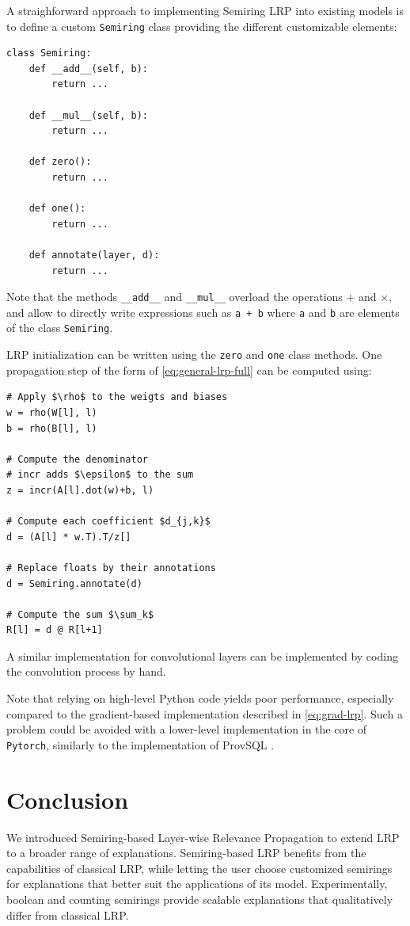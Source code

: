 \documentclass[twocolumn]{../cs-classes/cs-classes}
\newcommand*{\1}{\digitsbb{1}}
\newcommand*{\0}{\digitsbb{0}}
\begin{document}
A straighforward approach to implementing Semiring LRP into existing models is to define a custom \texttt{Semiring} class providing the different customizable elements:
\begin{verbatim}
class Semiring:
    def __add__(self, b):
        return ...

    def __mul__(self, b):
        return ...

    def zero():
        return ...

    def one():
        return ...

    def annotate(layer, d):
        return ...
\end{verbatim}
Note that the methods \texttt{__add__} and \texttt{__mul__} overload the operations $+$ and $\times$, and allow to directly write expressions such as \texttt{a + b} where \texttt{a} and \texttt{b} are elements of the class \texttt{Semiring}.

LRP initialization can be written using the \texttt{zero} and \texttt{one} class methods. One propagation step of the form of \autoref{eq:general-lrp-full} can be computed using:
\begin{verbatim}
# Apply $\rho$ to the weigts and biases
w = rho(W[l], l)
b = rho(B[l], l)

# Compute the denominator
# incr adds $\epsilon$ to the sum
z = incr(A[l].dot(w)+b, l)

# Compute each coefficient $d_{j,k}$
d = (A[l] * w.T).T/z[] 

# Replace floats by their annotations
d = Semiring.annotate(d)

# Compute the sum $\sum_k$
R[l] = d @ R[l+1]
\end{verbatim}

A similar implementation for convolutional layers can be implemented by coding the convolution process by hand.

Note that relying on high-level Python code yields poor performance, especially compared to the gradient-based implementation described in \autoref{eq:grad-lrp}. Such a problem could be avoided with a lower-level implementation in the core of \texttt{Pytorch}, similarly to the implementation of ProvSQL \cite{provsql}.

\section{Conclusion}
We introduced Semiring-based Layer-wise Relevance Propagation to extend LRP to a broader range of explanations. Semiring-based LRP benefits from the capabilities of classical LRP, while letting the user choose customized semirings for explanations that better suit the applications of its model. Experimentally, boolean and counting semirings provide scalable explanations that qualitatively differ from classical LRP.
\end{document}
